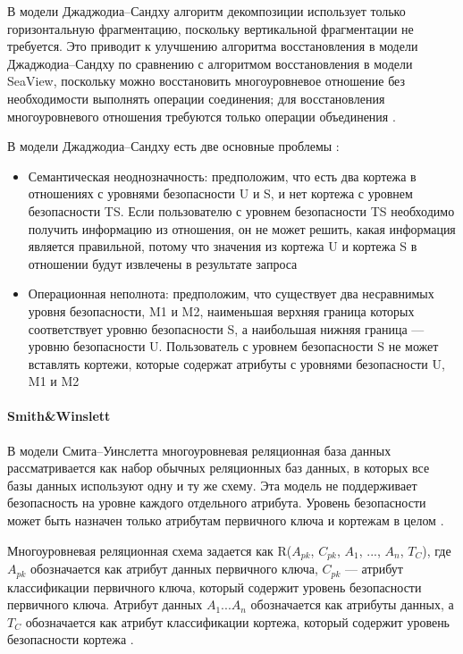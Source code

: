 В модели Джаджодиа–Сандху алгоритм декомпозиции использует только горизонтальную фрагментацию, поскольку
вертикальной фрагментации не требуется. Это приводит к улучшению алгоритма восстановления в модели Джаджодиа–Сандху
по сравнению с алгоритмом восстановления в модели SeaView, поскольку можно восстановить многоуровневое отношение
без необходимости выполнять операции соединения; для восстановления многоуровневого отношения требуются только
операции объединения \autocite{Osama}.

В модели Джаджодиа–Сандху есть две основные проблемы \autocite{Osama}:
\begin{itemize}
    \item Семантическая неоднозначность: предположим, что есть два кортежа в отношениях с уровнями безопасности
    U и S, и нет кортежа с уровнем безопасности TS. Если пользователю с уровнем безопасности TS необходимо
    получить информацию из отношения, он не может решить, какая информация является правильной, потому что
    значения из кортежа U и кортежа S в отношении будут извлечены в результате запроса
    \item Операционная неполнота: предположим, что существует два несравнимых уровня безопасности, M1 и M2,
    наименьшая верхняя граница которых соответствует уровню безопасности S, а наибольшая нижняя граница ---
    уровню безопасности U. Пользователь с уровнем безопасности S не может вставлять кортежи, которые содержат
    атрибуты с уровнями безопасности U, M1 и M2
\end{itemize}

\paragraph{Smith\&Winslett}

В модели Смита–Уинслетта многоуровневая реляционная база данных рассматривается как набор обычных реляционных
баз данных, в которых все базы данных используют одну и ту же схему. Эта модель не поддерживает безопасность
на уровне каждого отдельного атрибута. Уровень безопасности может быть назначен только атрибутам первичного
ключа и кортежам в целом \autocite{Osama}.

Многоуровневая реляционная схема задается как R($A_{pk}$, $C_{pk}$, $A_1$, ..., $A_{n}$, $T_C$), где $A_{pk}$ обозначается как атрибут данных первичного ключа, $C_{pk}$ --- атрибут классификации первичного ключа, который содержит уровень безопасности первичного ключа. Атрибут данных $A_{1} ... A_{n}$ обозначается как атрибуты данных, а $T_C$ обозначается как атрибут классификации кортежа, который содержит уровень безопасности кортежа \autocite{Osama}.

